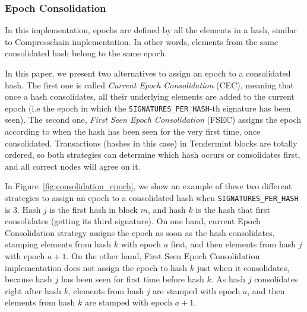 \subsubsection{Epoch Consolidation}\label{subsubsec:consolidation}

In this implementation, epochs are defined by all the elements in a hash, similar to
Compresschain implementation.
%
In other words, elements from the same consolidated hash belong to the same
epoch.
%
%

%

In this paper, we present two alternatives to assign an epoch to a consolidated
hash.
%
The first one is called \textit{Current Epoch Consolidation} (CEC), meaning that
once a hash consolidates, all their underlying elements are added to the current
epoch (i.e the epoch in which the \texttt{SIGNATURES\_PER\_HASH}-th signature
has been seen).
%
The second one, \textit{First Seen Epoch Consolidation} (FSEC) assigns the epoch
according to when the hash has been seen for the very first time, once
consolidated.
%
Transactions (hashes in this case) in Tendermint blocks are totally
ordered, so both strategies can determine which hash occurs or
consolidates first, and all correct nodes will agree on it.

%

In Figure~\ref{fig:consolidation_epoch}, we show an example of these two different
strategies to assign an epoch to a consolidated hash when
\texttt{SIGNATURES\_PER\_HASH} is 3.
%
Hash $j$ is the first hash in block $m$, and hash $k$ is the hash that first
consolidates (getting its third signature).
%
On one hand, current Epoch Consolidation strategy assigns the epoch as soon as the hash
consolidates, stamping elements from hash $k$ with epoch $a$ first, and then
elements from hash $j$ with epoch $a+1$.
%
On the other hand, First Seen Epoch Consolidation implementation does not assign the
epoch to hash $k$ just when it consolidates, because hash $j$ has been seen for first
time before hash $k$.
%
As hash $j$ consolidates right after hash $k$, elements from hash $j$ are
stamped with epoch $a$, and then elements from hash $k$ are stamped with epoch
$a+1$.

